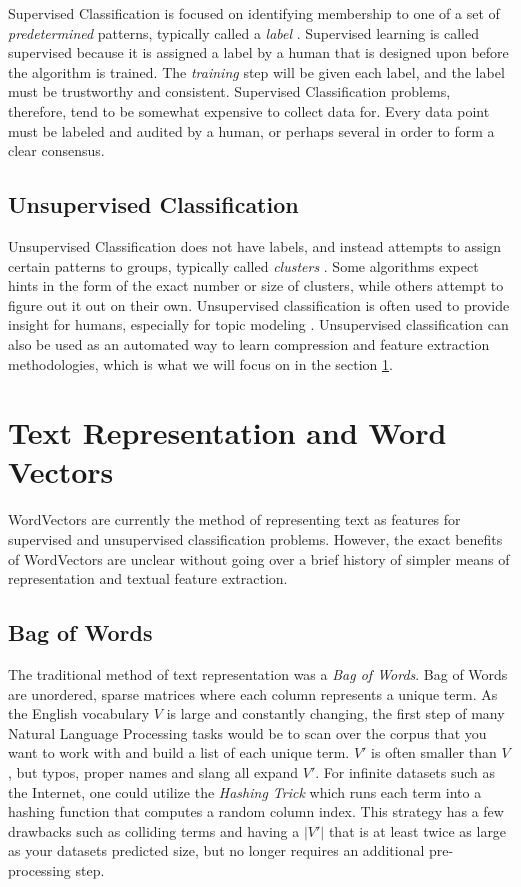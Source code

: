 Supervised Classification is focused on identifying membership to one of a set of \textit{predetermined} patterns, typically called a \textit{label} \cite{liu2007web}. Supervised learning is called supervised because it is assigned a label by a human that is designed upon before the algorithm is trained. The \textit{training} step will be given each label, and the label must be trustworthy and consistent. Supervised Classification problems, therefore, tend to be somewhat expensive to collect data for. Every data point must be labeled and audited by a human, or perhaps several in order to form a clear consensus.

\subsection{Unsupervised Classification}

Unsupervised Classification does not have labels, and instead attempts to assign certain patterns to groups, typically called \textit{clusters} \cite{celebi2015partitional}. Some algorithms expect hints in the form of the exact number or size of clusters, while others attempt to figure out it out on their own. Unsupervised classification is often used to provide insight for humans, especially for topic modeling \cite{celebi2015partitional}. Unsupervised classification can also be used as an automated way to learn compression and feature extraction methodologies, which is what we will focus on in the section \ref{sec:wordvectors}.  

\section{Text Representation and Word Vectors} \label{sec:wordvectors}

WordVectors \cite{word2vec} are currently the method of representing text as features for supervised and unsupervised classification problems. However, the exact benefits of WordVectors are unclear without going over a brief history of simpler means of representation and textual feature extraction.

\subsection{Bag of Words}

\par{
The traditional method of text representation was a \textit{Bag of Words}. Bag of Words are unordered, sparse matrices where each column represents a unique term. As the English vocabulary $V$ is large and constantly changing, the first step of many Natural Language Processing tasks would be to scan over the corpus that you want to work with and build a list of each unique term. $V'$ is often smaller than $V$, but typos, proper names and slang all expand $V'$. For infinite datasets such as the Internet, one could utilize the \textit{Hashing Trick} \cite{weinberger2009feature} which runs each term into a hashing function that computes a random column index. This strategy has a few drawbacks such as colliding terms and having a $|V'|$ that is at least twice as large as your datasets predicted size, but no longer requires an additional pre-processing step.
}

